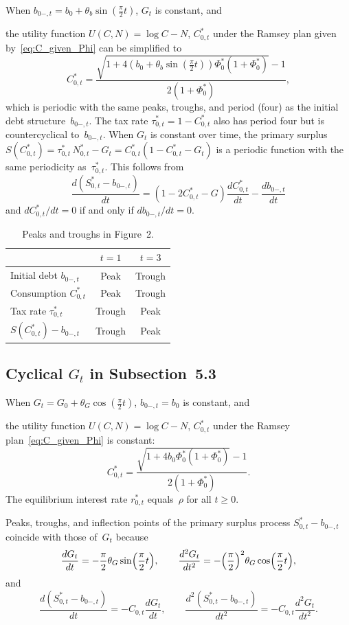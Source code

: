 \documentclass[12pt]{article}
\begin{document}
{When $b_{0-,t} = b_0 + \theta_b\sin(\tfrac{\pi}{2}t)$, $G_t$ is constant, and {the utility function $U(C, N)=\log C-N$, $C_{0,t}^*$ under the Ramsey plan given by~\eqref{eq:C_given_Phi} can be simplified to
\begin{equation}\label{eq:A19}
C_{0,t}^* = \frac{\sqrt{1+4(b_0+\theta_b\sin(\tfrac{\pi}{2}t))\Phi_0^*(1+\Phi_0^*)}-1}{2(1+\Phi_0^*)},
\end{equation}
which is periodic with the same peaks, troughs, and period (four) as the initial debt structure~$b_{0-,t}$. The tax rate $\tau_{0,t}^* = 1-C_{0,t}^*$ also has period four but is countercyclical to~$b_{0-,t}$. When $G_t$ is constant over time, the primary surplus $S(C_{0,t}^*) = \tau_{0,t}^*\, N_{0,t}^* - G_t = C_{0,t}^*(1-C_{0,t}^*-G_t)$ is a periodic function with the same periodicity as~$\tau_{0,t}^*$. This follows from
\[
\frac{d(S_{0,t}^*-b_{0-,t})}{dt} = (1-2C_{0,t}^*-G)\frac{dC_{0,t}^*}{dt} - \frac{db_{0-,t}}{dt}
\]
and $dC_{0,t}^*/dt = 0$ if and only if $db_{0-,t}/dt = 0$.

\begin{table}[h]
	\centering
	\caption{Peaks and troughs in Figure~2.}
	\begin{tabular}{lcc}
		\hline
		& $t=1$ & $t=3$ \\
		\hline
		Initial debt $b_{0-,t}$ & Peak & Trough \\
		Consumption $C_{0,t}^*$ & Peak & Trough \\
		Tax rate $\tau_{0,t}^*$ & Trough & Peak \\
		$S(C_{0,t}^*)-b_{0-,t}$ & Trough & Peak \\
		\hline
	\end{tabular}
\end{table}


\subsection{Cyclical $G_t$ in Subsection~5.3}

When $G_t = G_0 + \theta_G\cos(\tfrac{\pi}{2}t)$, $b_{0-,t} = b_0$ is constant, and {the utility function  $U(C, N)=\log C-N$, $C_{0,t}^*$ under the Ramsey plan~\eqref{eq:C_given_Phi} is constant:
\[
C_{0,t}^* = \frac{\sqrt{1+4b_0\Phi_0^*(1+\Phi_0^*)}-1}{2(1+\Phi_0^*)}.
\]
The equilibrium interest rate $r_{0,t}^*$ equals~$\rho$ for all $t \ge 0$.

Peaks, troughs, and inflection points of the primary surplus process $S_{0,t}^*-b_{0-,t}$ coincide with those of~$G_t$ because
\[
\frac{dG_t}{dt} = -\frac{\pi}{2}\theta_G\sin\Bigl(\frac{\pi}{2}t\Bigr), \qquad \frac{d^2 G_t}{dt^2} = -\Bigl(\frac{\pi}{2}\Bigr)^2 \theta_G\cos\Bigl(\frac{\pi}{2}t\Bigr),
\]
and
\[
\frac{d(S_{0,t}^*-b_{0-,t})}{dt} = -C_{0,t}\frac{dG_t}{dt}, \qquad \frac{d^2(S_{0,t}^*-b_{0-,t})}{dt^2} = -C_{0,t}\frac{d^2 G_t}{dt^2}.
\]

}}}
\end{document}
